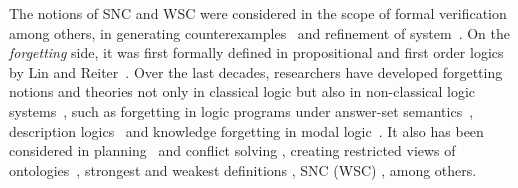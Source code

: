 \documentclass[letterpaper]{article} %
\begin{document}


The notions of SNC and WSC were considered in the scope of formal verification among others,  in generating counterexamples~\cite{dailler2018instrumenting} and refinement of  system~\cite{woodcock1990refinement}.
On the \emph{forgetting} side, it was first formally defined
in propositional and first order logics by Lin and Reiter~\cite{lin1994forget}.
Over the last decades, researchers have developed forgetting notions and theories not only in classical logic but also in non-classical logic systems~\cite{eiter2019brief}, such as forgetting in logic programs under answer-set semantics~\cite{DBLP:Zhang:AIJ2006,Eiter2008Semantic,Wong:PhD:Thesis,Yisong:KR:2012,Yisong:IJCAI:2013}, description logics~\cite{Wang:AMAI:2010,Lutz:IJCAI:2011,zhao2017role} and knowledge forgetting in modal logic~\cite{Yan:AIJ:2009,Kaile:JAIR:2009,Yongmei:IJCAI:2011,fang2019forgetting}. It also has been considered in planning~\cite{lin2003compiling} and conflict solving \cite{Lang2010Reasoning,Zhang2005Solving},
creating restricted views of ontologies~\cite{zhao2017role},
strongest and weakest definitions \cite{Lang2008On}, SNC (WSC) \cite{DBLP:journals/ai/Lin01}, among others.
\end{document}
